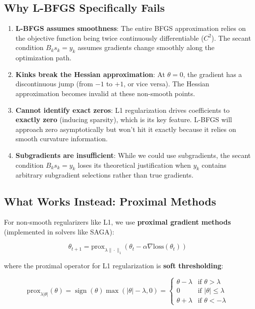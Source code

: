 \documentclass[11pt, a4paper, oneside]{article}
\begin{document}
\subsection{Why L-BFGS Specifically Fails}

\begin{enumerate}
    \item \textbf{L-BFGS assumes smoothness}: The entire BFGS approximation relies on the objective function being twice continuously differentiable ($C^2$). The secant condition $B_k s_k = y_k$ assumes gradients change smoothly along the optimization path.
    
    \item \textbf{Kinks break the Hessian approximation}: At $\theta = 0$, the gradient has a discontinuous jump (from $-1$ to $+1$, or vice versa). The Hessian approximation becomes invalid at these non-smooth points.
    
    \item \textbf{Cannot identify exact zeros}: L1 regularization drives coefficients to \textbf{exactly zero} (inducing sparsity), which is its key feature. L-BFGS will approach zero asymptotically but won't hit it exactly because it relies on smooth curvature information.
    
    \item \textbf{Subgradients are insufficient}: While we could use subgradients, the secant condition $B_k s_k = y_k$ loses its theoretical justification when $y_k$ contains arbitrary subgradient selections rather than true gradients.
\end{enumerate}

\subsection{What Works Instead: Proximal Methods}

For non-smooth regularizers like L1, we use \textbf{proximal gradient methods} (implemented in solvers like SAGA):

\begin{equation}
\theta_{t+1} = \text{prox}_{\lambda\|\cdot\|_1}\left(\theta_t - \alpha \nabla \text{loss}(\theta_t)\right)
\end{equation}

where the proximal operator for L1 regularization is \textbf{soft thresholding}:

\begin{equation}
\text{prox}_{\lambda|\theta|}(\theta) = \operatorname{sign}(\theta) \max(|\theta| - \lambda, 0) = \begin{cases}
\theta - \lambda & \text{if } \theta > \lambda \\
0 & \text{if } |\theta| \leq \lambda \\
\theta + \lambda & \text{if } \theta < -\lambda
\end{cases}
\end{equation}
\end{document}
